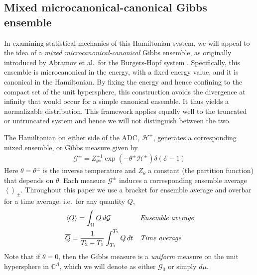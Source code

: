 \documentclass[11pt]{article}
\newcommand{\mean}[1]{\left< #1 \right>}
\newcommand{\CC}{{\mathbb{C}}}
\newcommand{\En}{\mathcal{E}}
\newcommand{\Ham}{\mathcal{H}}
\newcommand{\Hupdn}{\Ham^{\pm}}
\newcommand{\Gibbs}{\mathcal{G}}
\newcommand{\Gupdn}{\Gibbs^{\pm}}
\newcommand{\thupdn}{\theta^{\pm}}
\newcommand{\Gz}{\Gibbs_0}
\newcommand{\tavg}[1]{\overline{#1}}
\begin{document}
\subsection{Mixed microcanonical-canonical Gibbs ensemble}

In examining statistical mechanics of this Hamiltonian system, we will appeal to the idea of a {\em mixed microcanonical-canonical} Gibbs ensemble, as originally introduced by Abramov et al.~for the Burgers-Hopf system \cite{abramov2003}. Specifically, this ensemble is microcanonical in the energy, with a fixed energy value, and it is canonical in the Hamiltonian. By fixing the energy and hence confining to the compact set of the unit hypersphere, this construction avoids the divergence at infinity that would occur for a simple canonical ensemble. It thus yields a normalizable distribution. This framework applies equally well to the truncated or untruncated system and hence we will not distinguish between the two.

The Hamiltonian on either side of the ADC, $\Ham^{\pm}$, generates a corresponding mixed ensemble, or Gibbs measure given by 
\begin{align}
\label{Gibbs}
\Gupdn = Z_{\thupdn}^{-1} \exp(-\thupdn \Hupdn) \delta(\En - 1)
\end{align}
Here $\theta = \thupdn$ is the inverse temperature and $Z_{\theta}$ a constant (the partition function) that depends on $\theta$. Each measure $\Gupdn$ induces a corresponding ensemble average $\mean{}_{\pm}$. Throughout this paper we use a bracket for ensemble average and overbar for a time average; i.e.~for any quantity $Q$,
\begin{align}
&\mean{Q} = \int_{\Omega}  Q \, d \Gibbs
&&\mbox{\em Ensemble average} \\
&\tavg{Q} = \frac{1}{T_2-T_1} \int_{T_1}^{T_2} Q \, dt	 
&&\mbox{\em Time average}
\end{align}
Note that if $\theta = 0$, then the Gibbs measure is a {\em uniform} measure on the unit hypersphere in $\CC^{\Lambda}$, which we will denote as either $\Gz$ or simply $d\mu$.



\end{document}
